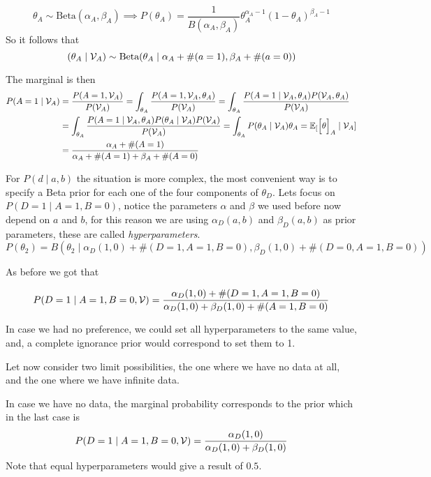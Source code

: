 \[
  \theta_{A} \sim \text{Beta}(\alpha_{A}, \beta_{A}) \implies P(\theta_{A})  = \frac{1}{B(\alpha_{A}, \beta_{A})}\theta_{A}^{\alpha_{A}-1}(1-\theta_{A})^{\beta_{A} - 1}
\]
So it follows that
\[
  (\theta_{A} \mid \mathcal{V}_{A}) \sim \text{Beta}(\theta_{A} \mid \alpha_{A} + \#(a=1), \beta_{A} + \#(a = 0))
\]

The marginal is then
\[
  \begin{aligned}
    P(A = 1 \mid \mathcal{V}_{A})
    &= \frac{P(A = 1, \mathcal{V}_{A})}{P(\mathcal{V}_{A})} = \int_{\theta_{A}}  \frac{P(A = 1, \mathcal{V}_{A}, \theta_{A})}{P(\mathcal{V}_{A})} =  \int_{\theta_{A}}  \frac{P(A = 1 \mid \mathcal{V}_{A}, \theta_{A}) P(\mathcal{V}_{A}, \theta_{A})}{P(\mathcal{V}_{A})} \\
    &=  \int_{\theta_{A}}  \frac{P(A = 1 \mid \mathcal{V}_{A}, \theta_{A}) P(\theta_{A} \mid \mathcal{V}_{A})P(\mathcal{V}_{A})}{P(\mathcal{V}_{A})} = \int_{\theta_{A}}P(\theta_{A}\mid \mathcal{V}_{A})\theta_{A} = \mathbb{E}_{[}\Big[\theta\Big]_{A} \mid \mathcal{V}_{A}] \\
    &= \frac{\alpha_{A} + \#(A= 1)}{\alpha_{A} + \#(A=1) + \beta_{A} + \#(A=0)}
  \end{aligned}
\]

For \(P(d \mid a ,b)\) the situation is more complex, the most convenient way is
to specify a Beta prior for each one of the four components of \(\theta_{D}\).
Lets focus on \(P(D = 1 \mid A = 1, B = 0)\), notice the parameters \(\alpha\)
and \(\beta\) we used before now depend on \(a\) and \(b\), for this reason we
are using \(\alpha_{D}(a,b)\) and \(\beta_{D}(a,b)\) as prior parameters, these
are called \emph{hyperparameters}.
\[
  P(\theta_{2}) = B(\theta_{2} \mid \alpha_{D}(1,0) + \#(D = 1, A = 1, B = 0), \beta_{D}(1,0) + \#(D = 0, A = 1, B = 0))
\]

As before we got that

\[
  P(D = 1 \mid A = 1, B = 0, \mathcal{V}) = \frac{\alpha_{D}(1,0) + \#(D = 1, A = 1, B = 0)}{\alpha_{D}(1,0) + \beta_{D}(1,0) + \#(A=1, B = 0)}
\]

In case we had no preference, we could set all hyperparameters to the same
value, and, a complete ignorance prior would correspond to set them to 1.

Let now consider two limit possibilities, the one where we have no data at all,
and the one where we have infinite data.

In case we have no data, the marginal probability corresponds to the prior which
in the last case is
\[
   P(D = 1 \mid A = 1, B = 0, \mathcal{V}) = \frac{\alpha_{D}(1,0)}{\alpha_{D}(1,0) + \beta_{D}(1,0)}
 \]
 Note that equal hyperparameters would give a result of \(0.5\).


